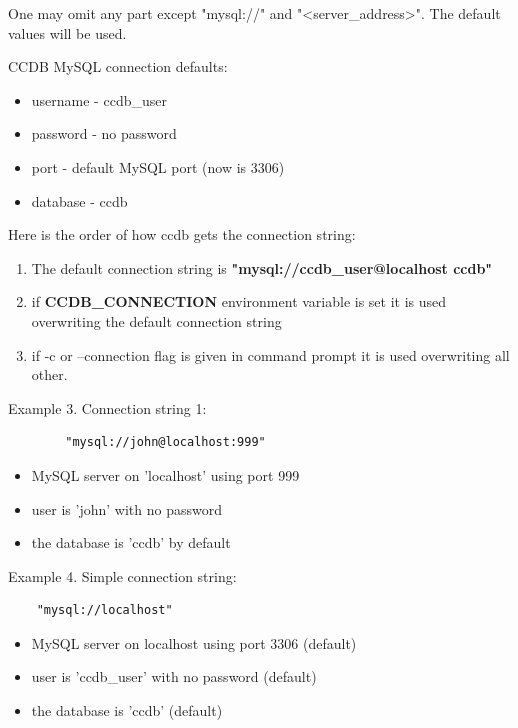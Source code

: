 \documentclass{article}
\begin{document}
One may omit any part except "mysql://" and "<server\_address>". The default
values will be used.

CCDB MySQL connection defaults:
\begin{itemize}
  \item username - ccdb\_user
  \item password - no password
  \item port - default MySQL port (now is 3306)
  \item database - ccdb
\end{itemize}


Here is the order of how ccdb gets the connection string:
\begin{enumerate}
  \item The default connection string is  \textbf{"mysql://ccdb\_user@localhost ccdb"}

  \item if \textbf{CCDB\_CONNECTION} environment variable is set it is used overwriting
        the default connection string

  \item if -c or --connection flag is given in command prompt it is used overwriting
        all other.
\end{enumerate}

Example 3. Connection string 1:

\begin{verbatim}
        "mysql://john@localhost:999"
\end{verbatim}


\begin{itemize}
  \item MySQL server on 'localhost' using port 999
  \item user is 'john' with no password
  \item the database is 'ccdb' by default
\end{itemize}

Example 4. Simple connection string:
\begin{verbatim}	
	"mysql://localhost"
\end{verbatim}

\begin{itemize}
  \item MySQL server on localhost using port 3306 (default)
  \item user is 'ccdb\_user' with no password (default)
  \item the database is 'ccdb' (default)
\end{itemize}
\end{document}
